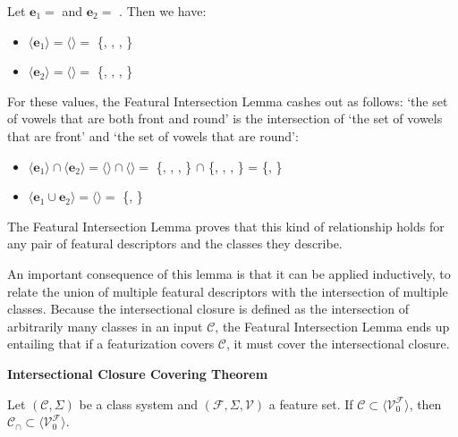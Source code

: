 \documentclass[11pt, oneside]{article}   	%
\begin{document}
\vspace{\baselineskip} \noindent Let $\mathbf{e}_1 =$  and $\mathbf{e}_2 =$ . Then we have: \begin{itemize}
    \item $\langle \mathbf{e}_1 \rangle = \langle$$\rangle =$ \{\textipa{\oe}, , , \}
    \item $\langle \mathbf{e}_2 \rangle = \langle$$\rangle =$ \{\textipa{\oe}, , , \}
    \end{itemize}
\noindent For these values, the Featural Intersection Lemma cashes out as follows: `the set of vowels that are both front and round' is the intersection of `the set of vowels that are front' and `the set of vowels that are round': \begin{itemize}
    \item $\langle \mathbf{e}_1 \rangle \cap \langle \mathbf{e}_2 \rangle =  \langle$$\rangle \cap \langle$$\rangle =$ \{\textipa{\oe}, , , \} $\cap$ \{\textipa{\oe}, , , \} = \{\textipa{\oe}, \}
    \item $\langle \mathbf{e}_1 \cup \mathbf{e}_2 \rangle = \langle$$\rangle =$ \{\textipa{\oe}, \}
    \end{itemize}

\noindent The Featural Intersection Lemma proves that this kind of relationship holds for any pair of featural descriptors and the classes they describe.

An important consequence of this lemma is that it can be applied inductively, to relate the union of multiple featural descriptors with the intersection of multiple classes. Because the intersectional closure is defined as the intersection of arbitrarily many classes in an input $\mathcal C$, the Featural Intersection Lemma ends up entailing that if a featurization covers $\mathcal C$, it must cover the intersectional closure.

\vspace{\baselineskip} \noindent \textbf{Intersectional Closure Covering Theorem}

Let $(\mathcal C, \Sigma)$ be a class system and $(\mathcal F, \Sigma, \mathcal V)$ a feature set. If $\mathcal C \subset \langle \mathcal V_0^\mathcal F \rangle$, then $\mathcal C_\cap \subset\langle \mathcal V_0^\mathcal F \rangle $.
\end{document}
